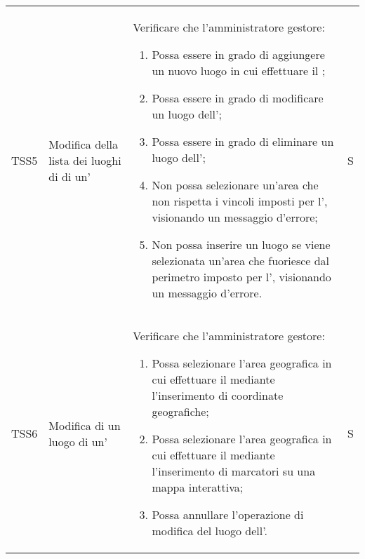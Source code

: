 {\begin{longtable}{ c  C{2.5cm}  C{10cm} C{1cm}}
TSS5 & Modifica della lista dei luoghi di  di un' & 
Verificare che l'amministratore gestore:
\begin{enumerate}
    \item Possa essere in grado di aggiungere un nuovo luogo in cui effettuare il ;
    \item Possa essere in grado di modificare un luogo dell';
    \item Possa essere in grado di eliminare un luogo dell';
    \item Non possa selezionare un'area che non rispetta i vincoli imposti per l', visionando un messaggio d'errore;
    \item Non possa inserire un luogo se viene selezionata un'area che fuoriesce dal perimetro imposto per l', visionando un messaggio d'errore.
\end{enumerate} & S \\

TSS6 & Modifica di un luogo di un' & 
Verificare che l'amministratore gestore:
\begin{enumerate}[resume]
    \item Possa selezionare l'area geografica in cui effettuare il  mediante l'inserimento di coordinate geografiche;
    \item Possa selezionare l'area geografica in cui effettuare il  mediante l'inserimento di marcatori su una mappa interattiva;
    \item Possa annullare l'operazione di modifica del luogo dell'.
\end{enumerate} & S \\


\end{longtable}}
